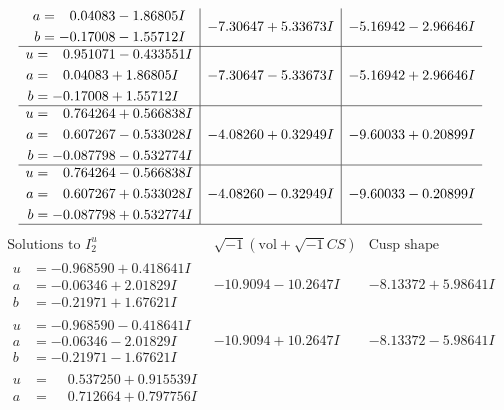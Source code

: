 \documentclass[1p]{elsarticle_modified}
\theoremstyle{definition}
\newcommand{\I}{\sqrt{-1}}
\begin{document}
$$\begin{array}{c|c|c}
\begin{aligned}
a &= \phantom{-}0.04083 - 1.86805 I \\
b &= -0.17008 - 1.55712 I\end{aligned}
 & -7.30647 + 5.33673 I & -5.16942 - 2.96646 I \\ \hline\begin{aligned}
u &= \phantom{-}0.951071 - 0.433551 I \\
a &= \phantom{-}0.04083 + 1.86805 I \\
b &= -0.17008 + 1.55712 I\end{aligned}
 & -7.30647 - 5.33673 I & -5.16942 + 2.96646 I \\ \hline\begin{aligned}
u &= \phantom{-}0.764264 + 0.566838 I \\
a &= \phantom{-}0.607267 - 0.533028 I \\
b &= -0.087798 - 0.532774 I\end{aligned}
 & -4.08260 + 0.32949 I & -9.60033 + 0.20899 I \\ \hline\begin{aligned}
u &= \phantom{-}0.764264 - 0.566838 I \\
a &= \phantom{-}0.607267 + 0.533028 I \\
b &= -0.087798 + 0.532774 I\end{aligned}
 & -4.08260 - 0.32949 I & -9.60033 - 0.20899 I\\
 \hline 
 \end{array}$$\newpage$$\begin{array}{c|c|c}  
\text{Solutions to }I^u_{2}& \I (\text{vol} + \sqrt{-1}CS) & \text{Cusp shape}\\
 \hline 
\begin{aligned}
u &= -0.968590 + 0.418641 I \\
a &= -0.06346 + 2.01829 I \\
b &= -0.21971 + 1.67621 I\end{aligned}
 & -10.9094 - 10.2647 I & -8.13372 + 5.98641 I \\ \hline\begin{aligned}
u &= -0.968590 - 0.418641 I \\
a &= -0.06346 - 2.01829 I \\
b &= -0.21971 - 1.67621 I\end{aligned}
 & -10.9094 + 10.2647 I & -8.13372 - 5.98641 I \\ \hline\begin{aligned}
u &= \phantom{-}0.537250 + 0.915539 I \\
a &= \phantom{-}0.712664 + 0.797756 I \\

\end{aligned}
\end{array}$$
\end{document}
